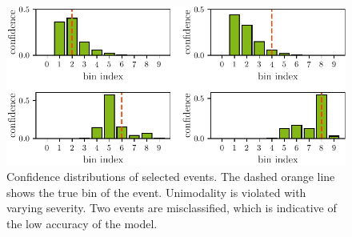 \begin{figure}
  \centering
  \includegraphics[scale=1]{content/plots/single_events_lessheight.pdf}
  \caption{
    Confidence distributions of selected events.
    The dashed orange line shows the true bin of the event.
    Unimodality is violated with varying severity.
    Two events are misclassified,
      which is indicative of the low accuracy of the model.
  }
  \label{fig:bootstrap:single_events}
\end{figure}

